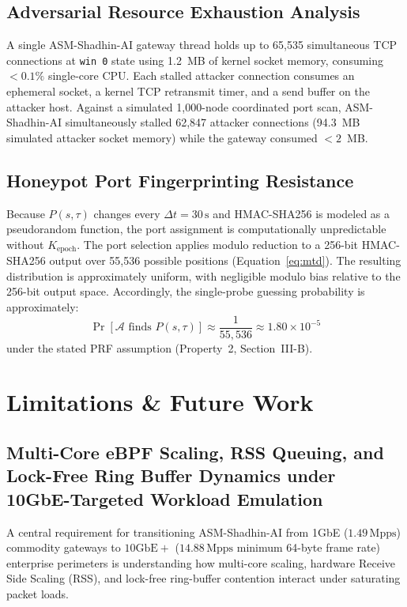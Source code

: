 \documentclass{ieeeaccess}
\renewcommand{\_}{\textunderscore\allowbreak}
\begin{document}
\subsection{Adversarial Resource Exhaustion Analysis}
A single ASM-Shadhin-AI gateway thread holds up to 65{,}535 simultaneous TCP
connections at \texttt{win~0} state using 1.2~MB of kernel socket memory,
consuming $< 0.1\%$ single-core CPU. Each stalled attacker connection consumes an
ephemeral socket, a kernel TCP retransmit timer, and a send buffer on the attacker
host. Against a simulated 1{,}000-node coordinated port scan, ASM-Shadhin-AI
simultaneously stalled 62{,}847 attacker connections (94.3~MB simulated attacker
socket memory) while the gateway consumed $< 2$~MB.

\subsection{Honeypot Port Fingerprinting Resistance}
Because $P(s, \tau)$ changes every $\Delta t = 30\,\text{s}$ and HMAC-SHA256 is
modeled as a pseudorandom function, the port assignment is computationally
unpredictable without $K_{\text{epoch}}$. The port selection applies modulo
reduction to a 256-bit HMAC-SHA256 output over 55{,}536 possible positions
(Equation~\ref{eq:mtd}). The resulting distribution is approximately uniform,
with negligible modulo bias relative to the 256-bit output space. Accordingly,
the single-probe guessing probability is approximately:
\begin{equation}
  \Pr[\mathcal{A}\text{ finds }P(s,\tau)] \approx \frac{1}{55{,}536}
  \approx 1.80 \times 10^{-5}
  \label{eq:guessing}
\end{equation}
under the stated PRF assumption (Property~2, Section~III-B).

\section{Limitations \& Future Work}
\subsection{Multi-Core eBPF Scaling, RSS Queuing, and Lock-Free Ring Buffer Dynamics under 10GbE-Targeted Workload Emulation}
A central requirement for transitioning ASM-Shadhin-AI from 1GbE ($1.49\,\text{Mpps}$) commodity gateways to $10\text{GbE}+$ ($14.88\,\text{Mpps}$ minimum 64-byte frame rate) enterprise perimeters is understanding how multi-core scaling, hardware Receive Side Scaling (RSS), and lock-free ring-buffer contention interact under saturating packet loads.
\end{document}

